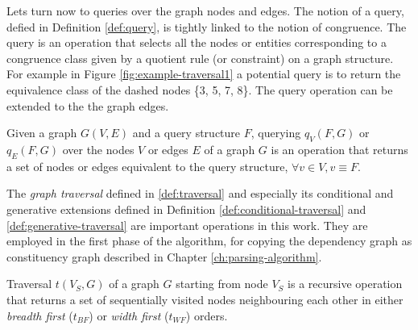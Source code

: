 
Lets turn now to queries over the graph nodes and edges. The notion of a query, defied in Definition \ref{def:query}, is tightly linked to the notion of congruence. The query is an operation that selects all the nodes or entities corresponding to a congruence class given by a quotient rule (or constraint) on a graph structure. For example in Figure \ref{fig:example-traversal1} a potential query is to return the equivalence class of the dashed nodes \{3, 5, 7, 8\}. The query operation can be extended to the the graph edges. 

\begin{definition}\label{def:query}
    Given a graph $G(V,E)$ and a query structure $F$, querying $q_{V}(F,G)$ or $q_{E}(F,G)$ over the nodes $V$ or edges $E$ of a graph $G$ is an operation that returns a set of nodes or edges equivalent to the query structure, $ \forall v \in V,  v \equiv F$. 
\end{definition}

The \textit{graph traversal} defined in \ref{def:traversal} and especially its conditional and generative extensions defined in Definition \ref{def:conditional-traversal} and \ref{def:generative-traversal} are  important operations in this work. They are employed in the first phase of the algorithm, for copying the dependency graph as constituency graph described in Chapter \ref{ch:parsing-algorithm}. 

\begin{definition}[Traversal]\label{def:traversal}
    Traversal $t(V_S,G)$ of a graph $G$ starting from node $V_S$ is a recursive operation that returns a set of sequentially visited nodes neighbouring each other in either \textit{breadth first} ($t_{BF}$) or \textit{width first} ($t_{WF}$) orders.
\end{definition}

